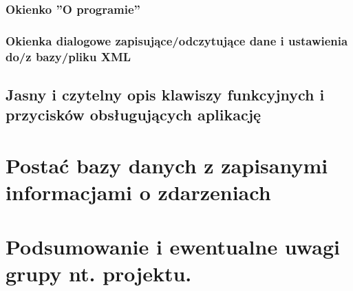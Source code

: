 \documentclass[a4paper,12pt]{article}
\begin{document}
\subsubsection{Okienko ''O programie''}
\subsubsection{Okienka dialogowe zapisujące/odczytujące dane i ustawienia do/z bazy/pliku XML}
\subsection{Jasny i czytelny opis klawiszy funkcyjnych i przycisków obsługujących aplikację}
\section{Postać bazy danych z zapisanymi informacjami o zdarzeniach}
\section{Podsumowanie i ewentualne uwagi grupy nt. projektu. }
\end{document}
